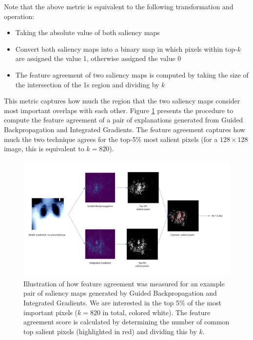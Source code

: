 Note that the above metric is equivalent to the following transformation and operation:
\begin{itemize}
    \item Taking the absolute value of both saliency maps
    \item Convert both saliency maps into a binary map in which pixels within top-$k$ are assigned the value 1, otherwise assigned the value 0
    \item The feature agreement of two saliency maps is computed by taking the size of the intersection of the 1s region and dividing by $k$
\end{itemize}

This metric captures how much the region that the two saliency maps consider most important overlaps with each other. Figure \ref{fig:featureAgreementDemo} presents the procedure to compute the feature agreement of a pair of explanations generated from Guided Backpropagation and Integrated Gradients. The feature agreement captures how much the two technique agrees for the top-5\% most salient pixels (for a $128\times128$ image, this is equivalent to $k= 820$).

\begin{figure}
    \centering
    \includegraphics[width=\textwidth]{images/feature-agreement-demo.png}
    \caption{Illustration of how feature agreement was measured for an example pair of saliency maps generated by Guided Backpropagation and Integrated Gradients. We are interested in the top 5\% of the most important pixels ($k=820$ in total, colored white). The feature agreement score is calculated by determining the number of common top salient pixels (highlighted in red) and dividing this by $k$.}
    \label{fig:featureAgreementDemo}
\end{figure}


